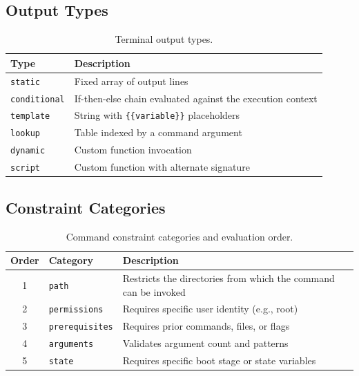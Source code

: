 \subsection{Output Types}\label{subsec:app-outputs}

\begin{table}[H]
\centering
\caption{Terminal output types.}
\label{tab:outputs}
\begin{tabularx}{\textwidth}{lX}
\toprule
\textbf{Type} & \textbf{Description} \\
\midrule
\texttt{static}      & Fixed array of output lines \\
\texttt{conditional}  & If-then-else chain evaluated against the execution context \\
\texttt{template}     & String with \texttt{\{\{variable\}\}} placeholders \\
\texttt{lookup}       & Table indexed by a command argument \\
\texttt{dynamic}      & Custom function invocation \\
\texttt{script}       & Custom function with alternate signature \\
\bottomrule
\end{tabularx}
\end{table}

\subsection{Constraint Categories}\label{subsec:app-constraints}

\begin{table}[H]
\centering
\caption{Command constraint categories and evaluation order.}
\label{tab:constraints}
\begin{tabularx}{\textwidth}{clX}
\toprule
\textbf{Order} & \textbf{Category} & \textbf{Description} \\
\midrule
1 & \texttt{path}          & Restricts the directories from which the command can be invoked \\
2 & \texttt{permissions}   & Requires specific user identity (e.g., root) \\
3 & \texttt{prerequisites} & Requires prior commands, files, or flags \\
4 & \texttt{arguments}     & Validates argument count and patterns \\
5 & \texttt{state}         & Requires specific boot stage or state variables \\
\bottomrule
\end{tabularx}
\end{table}

